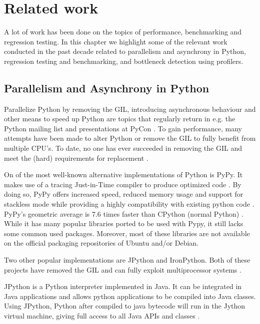 \chapter{Related work}
\label{cpt:related_work}

A lot of work has been done on the topics of performance, benchmarking and regression testing.
In this chapter we highlight some of the relevant work conducted in the past decade related to parallelism and asynchrony in Python, regression testing and benchmarking, and bottleneck detection using profilers.

\section{Parallelism and Asynchrony in Python}
\label{sct:parallelism_and_asynchrony_in_python}
Parallelize Python by removing the GIL, introducing asynchronous behaviour and other means to speed up Python are topics that regularly return in e.g. the Python mailing list and presentations at PyCon \cite{python2015global}.
To gain performance, many attempts have been made to alter Python or remove the GIL to fully benefit from multiple CPU's.
To date, no one has ever succeeded in removing the GIL and meet the (hard) requirements for replacement \cite{python2015global}.

On of the most well-known alternative implementations of Python is PyPy.
It makes use of a tracing Just-in-Time compiler to produce optimized code \cite{bolz2009tracing}.
By doing so, PyPy offers increased speed, reduced memory usage and support for stackless mode while providing a highly compatibility with existing python code \cite{pypy2016pypy}.
PyPy's geometric average is 7.6 times faster than CPython (normal Python) \cite{pypy2016speed}.
While it has many popular libraries ported to be used with Pypy, it still lacks some common used packages.
Moreover, most of these libraries are not available on the official packaging repositories of Ubuntu and/or Debian.

Two other popular implementations are JPython and IronPython.
Both of these projects have removed the GIL and can fully exploit multiprocessor systems \cite{python2015global}.

JPython is a Python interpreter implemented in Java. It can be integrated in Java applications and allows python applications to be compiled into Java classes.
Using JPython, Python after compiled to java bytecode will run in the Jython virtual machine, giving full access to all Java APIs and classes \cite{jython2016why}.

